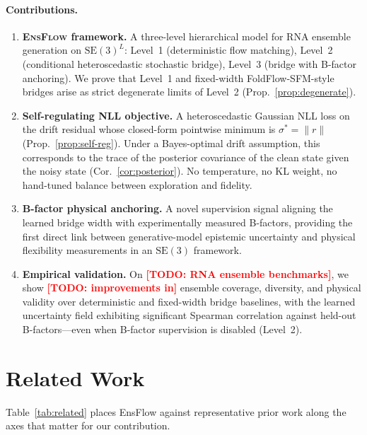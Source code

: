 \documentclass{article}
\theoremstyle{remark}
\theoremstyle{definition}
\newcommand{\SE}{\mathrm{SE}}
\newcommand{\todo}[1]{\textcolor{red}{\textbf{[TODO: #1]}}}
\begin{document}
\paragraph{Contributions.}
\begin{enumerate}[leftmargin=1.6em,itemsep=2pt,topsep=3pt]
\item \textbf{\textsc{EnsFlow} framework.} A three-level hierarchical model for
RNA ensemble generation on $\SE(3)^L$: Level~1 (deterministic flow matching),
Level~2 (conditional heteroscedastic stochastic bridge), Level~3 (bridge with
B-factor anchoring). We prove that Level~1 and fixed-width FoldFlow-SFM-style
bridges arise as strict degenerate limits of Level~2
(Prop.~\ref{prop:degenerate}).

\item \textbf{Self-regulating NLL objective.} A heteroscedastic Gaussian NLL
loss on the drift residual whose closed-form pointwise minimum is
$\sigma^{\ast}=\|r\|$ (Prop.~\ref{prop:self-reg}). Under a Bayes-optimal drift
assumption, this corresponds to the trace of the posterior covariance of the
clean state given the noisy state (Cor.~\ref{cor:posterior}). No temperature,
no KL weight, no hand-tuned balance between exploration and fidelity.

\item \textbf{B-factor physical anchoring.} A novel supervision signal aligning
the learned bridge width with experimentally measured B-factors, providing the
first direct link between generative-model epistemic uncertainty and physical
flexibility measurements in an $\SE(3)$ framework.

\item \textbf{Empirical validation.} On \todo{RNA ensemble benchmarks}, we show
\todo{improvements in} ensemble coverage, diversity, and physical validity
over deterministic and fixed-width bridge baselines, with the learned
uncertainty field exhibiting significant Spearman correlation against held-out
B-factors---even when B-factor supervision is disabled (Level~2).
\end{enumerate}

\section{Related Work}
\label{sec:related}

Table~\ref{tab:related} places EnsFlow against representative prior work along
the axes that matter for our contribution.
\end{document}
